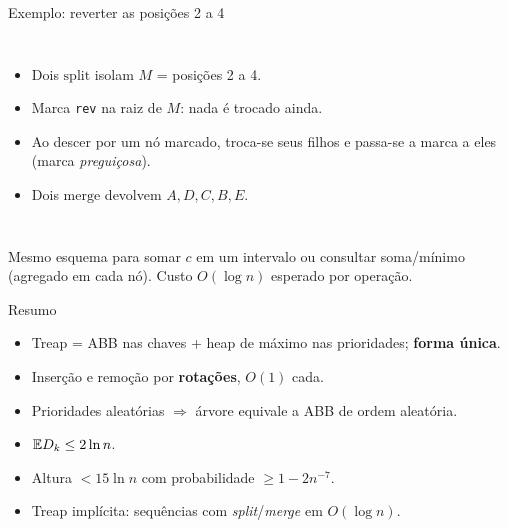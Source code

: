 \documentclass[aspectratio=169,11pt]{beamer}
\theoremstyle{definition}
\begin{document}
\begin{frame}{Exemplo: reverter as posições 2 a 4}
  \begin{columns}[T]
  \centering
  \begin{itemize}
  \item Dois $\mathrm{split}$ isolam $M$ = posições 2 a 4.
  \item Marca \texttt{rev} na raiz de $M$: nada é trocado ainda.
  \item Ao descer por um nó marcado, troca-se seus filhos e passa-se
    a marca a eles (marca \emph{preguiçosa}).
  \item Dois $\mathrm{merge}$ devolvem $A,D,C,B,E$.
  \end{itemize}
  \end{columns}
  \pause \medskip Mesmo esquema para somar $c$ em um intervalo ou
  consultar soma/mínimo (agregado em cada nó). Custo $O(\log n)$
  esperado por operação.
\end{frame}
 
\begin{frame}{Resumo}
  \begin{itemize}
  \item Treap = ABB nas chaves + heap de máximo nas prioridades;
    \textbf{forma única}.
  \item Inserção e remoção por \textbf{rotações}, $O(1)$ cada.
  \item Prioridades aleatórias $\Rightarrow$ árvore equivale a ABB de
    ordem aleatória.
  \item $\mathbb{E}{D_k}\leq 2\ln n$.
  \item Altura $<15\ln n$ com probabilidade $\ge1-2n^{-7}$.
  \item Treap implícita: sequências com \textit{split}/\textit{merge}
    em $O(\log n)$.
  \end{itemize}
\end{frame}
 
\end{document}
